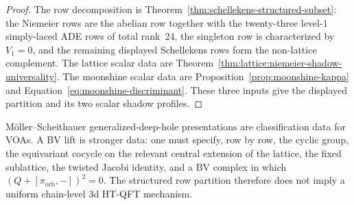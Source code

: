 \begin{proof}
The row decomposition is Theorem~\ref{thm:schellekens-structured-subset}:
the Niemeier rows are the abelian row together with the twenty-three
level-$1$ simply-laced ADE rows of total rank~$24$, the singleton row is
characterized by $V_1=0$, and the remaining displayed Schellekens rows
form the non-lattice complement. The lattice scalar data are
Theorem~\ref{thm:lattice:niemeier-shadow-universality}. The moonshine
scalar data are Proposition~\ref{prop:moonshine-kappa} and
Equation~\eqref{eq:moonshine-discriminant}. These three inputs give the
displayed partition and its two scalar shadow profiles.
\end{proof}

\begin{remark}
M\"oller--Scheithauer generalized-deep-hole presentations are
classification data for VOAs. A BV lift is stronger data: one must
specify, row by row, the cyclic group, the equivariant cocycle on the
relevant central extension of the lattice, the fixed sublattice, the
twisted Jacobi identity, and a BV complex in which
$(Q+[\pi_{\mathrm{orb}},-])^2=0$. The structured row partition therefore
does not imply a uniform chain-level $3$d HT-QFT mechanism.
\end{remark}
